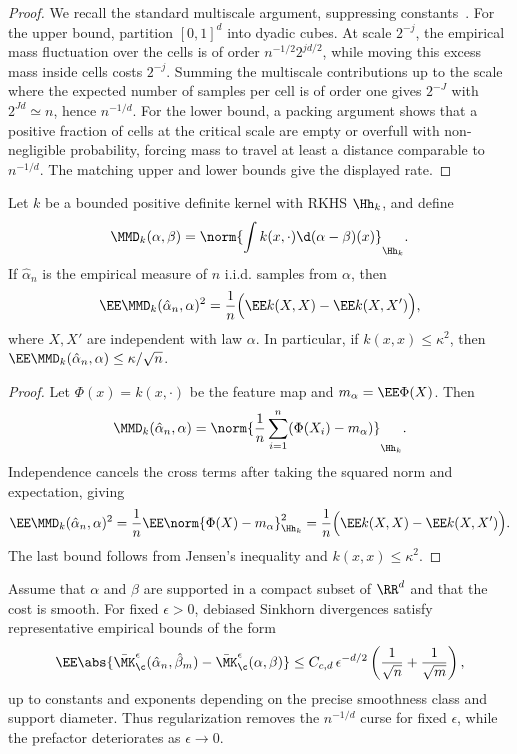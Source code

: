 \begin{proof}
		We recall the standard multiscale argument, suppressing constants~\cite{dudley1969speed,fournier2015rate,weed2017sharp}. For the upper bound, partition $[0,1]^d$ into dyadic cubes. At scale $2^{-j}$, the empirical mass fluctuation over the cells is of order $n^{-1/2}2^{jd/2}$, while moving this excess mass inside cells costs $2^{-j}$. Summing the multiscale contributions up to the scale where the expected number of samples per cell is of order one gives $2^{-J}$ with $2^{Jd}\simeq n$, hence $n^{-1/d}$. For the lower bound, a packing argument shows that a positive fraction of cells at the critical scale are empty or overfull with non-negligible probability, forcing mass to travel at least a distance comparable to $n^{-1/d}$. The matching upper and lower bounds give the displayed rate.
\end{proof}

\begin{prop}\label{prop-mmd-sample-rate}
	Let $k$ be a bounded positive definite kernel with RKHS $\Hh_k$, and define
	\[
		\MMD_k(\alpha,\beta)
		=
		\norm{\int k(x,\cdot)\d(\alpha-\beta)(x)}_{\Hh_k}.
	\]
	If $\hat\alpha_n$ is the empirical measure of $n$ i.i.d. samples from $\alpha$, then
	\[
		\EE\MMD_k(\hat\alpha_n,\alpha)^2
		=\frac{1}{n}\Big(\EE k(X,X)-\EE k(X,X')\Big),
	\]
	where $X,X'$ are independent with law $\alpha$. In particular, if $k(x,x)\leq \kappa^2$, then $\EE\MMD_k(\hat\alpha_n,\alpha)\leq \kappa/\sqrt n$.
\end{prop}

\begin{proof}
	Let $\Phi(x)=k(x,\cdot)$ be the feature map and $m_\alpha=\EE\Phi(X)$. Then
	\[
		\MMD_k(\hat\alpha_n,\alpha)
		=\norm{\frac1n\sum_{i=1}^n(\Phi(X_i)-m_\alpha)}_{\Hh_k}.
	\]
	Independence cancels the cross terms after taking the squared norm and expectation, giving
	\[
		\EE\MMD_k(\hat\alpha_n,\alpha)^2
		=\frac1n\EE\norm{\Phi(X)-m_\alpha}_{\Hh_k}^2
		=\frac{1}{n}\Big(\EE k(X,X)-\EE k(X,X')\Big).
	\]
	The last bound follows from Jensen's inequality and $k(x,x)\leq\kappa^2$.
\end{proof}

\begin{prop}\label{prop-sinkhorn-sample-rate}
	Assume that $\alpha$ and $\beta$ are supported in a compact subset of $\RR^d$ and that the cost is smooth. For fixed $\epsilon>0$, debiased Sinkhorn divergences satisfy representative empirical bounds of the form
	\[
		\EE\abs{\bar\MK_\c^\epsilon(\hat\alpha_n,\hat\beta_m)-\bar\MK_\c^\epsilon(\alpha,\beta)}
		\leq
		C_{c,d}\,\epsilon^{-d/2}\left(\frac1{\sqrt n}+\frac1{\sqrt m}\right),
	\]
	up to constants and exponents depending on the precise smoothness class and support diameter. Thus regularization removes the $n^{-1/d}$ curse for fixed $\epsilon$, while the prefactor deteriorates as $\epsilon\to0$.
\end{prop}

